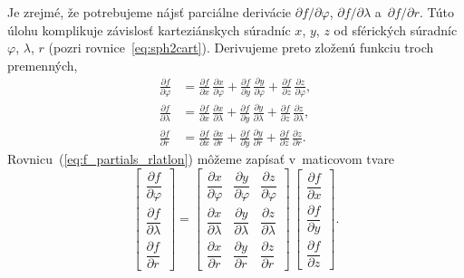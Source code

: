 \documentclass[a4paper,12pt]{book}
\begin{document}
Je zrejmé, že potrebujeme nájsť parciálne derivácie $\partial f \slash \partial 
\varphi$, $\partial f \slash \partial \lambda$ a~$\partial f \slash \partial 
r$.  Túto úlohu komplikuje závislosť karteziánskych súradníc $x$, $y$, $z$ od 
sférických súradníc $\varphi$, $\lambda$, $r$ (pozri 
rovnice~\ref{eq:sph2cart}).  Derivujeme preto zloženú funkciu troch premenných,
%
\begin{equation}
\label{eq:f_partials_rlatlon}
\begin{split}
\frac{\partial f}{\partial \varphi} &= \frac{\partial f}{\partial x} \, 
\frac{\partial x}{\partial \varphi} + \frac{\partial f}{\partial y} \, 
\frac{\partial y}{\partial \varphi} + \frac{\partial f}{\partial z} \, 
\frac{\partial z}{\partial \varphi}{,}\\[2ex]
%
\frac{\partial f}{\partial \lambda} &= \frac{\partial f}{\partial x} \, 
\frac{\partial x}{\partial \lambda} + \frac{\partial f}{\partial y} \, 
\frac{\partial y}{\partial \lambda} + \frac{\partial f}{\partial z} \, 
\frac{\partial z}{\partial \lambda}{,}\\[2ex]
%
\frac{\partial f}{\partial r} &= \frac{\partial f}{\partial x} \, 
\frac{\partial x}{\partial r} + \frac{\partial f}{\partial y} \, \frac{\partial 
y}{\partial r} + \frac{\partial f}{\partial z} \, \frac{\partial z}{\partial 
r}{.}
\end{split}
\end{equation}
%
Rovnicu~(\ref{eq:f_partials_rlatlon}) môžeme zapísať v~maticovom tvare
%
\begin{equation}
\label{eq:f_partials_rlatlon_2}
\begin{bmatrix}
\dfrac{\partial f}{\partial \varphi}\\[2ex]
\dfrac{\partial f}{\partial \lambda}\\[2ex]
\dfrac{\partial f}{\partial r}
\end{bmatrix}
%
=
%
\begin{bmatrix}
\dfrac{\partial x}{\partial \varphi} & \dfrac{\partial y}{\partial \varphi} 
& \dfrac{\partial z}{\partial \varphi}\\[2ex]
\dfrac{\partial x}{\partial \lambda} & \dfrac{\partial y}{\partial \lambda
} & \dfrac{\partial z}{\partial \lambda}\\[2ex]
\dfrac{\partial x}{\partial r} & \dfrac{\partial y}{\partial r} 
& \dfrac{\partial z}{\partial r}
\end{bmatrix}
%
\,
%
\begin{bmatrix}
\dfrac{\partial f}{\partial x}\\[2ex]
\dfrac{\partial f}{\partial y}\\[2ex]
\dfrac{\partial f}{\partial z}
\end{bmatrix}
%
{.}
\end{equation}
\end{document}
